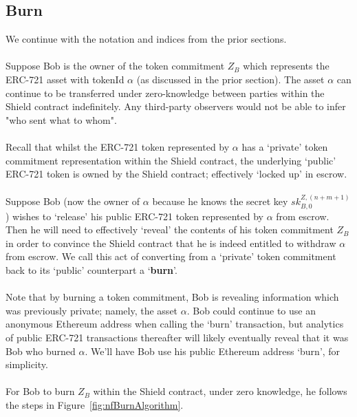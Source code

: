 \subsection{Burn}
\label{sec:721Burn}

We continue with the notation and indices from the prior sections.\\
\\
Suppose Bob is the owner of the token commitment $Z_B$ which represents the ERC-721 asset with tokenId $\alpha$ (as discussed in the prior section).
The asset $\alpha$ can continue to be transferred under zero-knowledge between parties within the Shield contract indefinitely.
Any third-party observers would not be able to infer "who sent what to whom".\\
\\
Recall that whilst the ERC-721 token represented by $\alpha$ has a `private' token commitment representation within the Shield contract, the underlying `public' ERC-721 token is owned by the Shield contract; effectively `locked up' in escrow.\\
\\
Suppose Bob (now the owner of $\alpha$ because he knows the secret key $sk^{Z,(n+m+1)}_{B,0}$) wishes to `release' his public ERC-721 token represented by $\alpha$ from escrow.
Then he will need to effectively `reveal' the contents of his token commitment $Z_B$ in order to convince the Shield contract that he is indeed entitled to withdraw $\alpha$ from escrow.
We call this act of converting from a `private' token commitment back to its `public' counterpart a `\textbf{burn}'.\\
\\
Note that by burning a token commitment, Bob is revealing information which was previously private; namely, the asset $\alpha$. Bob could continue to use an anonymous Ethereum address when calling the `burn' transaction, but analytics of public ERC-721 transactions thereafter will likely eventually reveal that it was Bob who burned $\alpha$. We'll have Bob use his public Ethereum address `burn', for simplicity.\\
\\

\noindent
For Bob to burn $Z_B$ within the Shield contract, under zero knowledge, he follows the steps in Figure~\ref{fig:nfBurnAlgorithm}.

